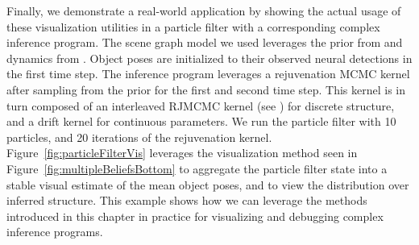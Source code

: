 Finally, we demonstrate a real-world application by showing the actual usage of these visualization utilities in a particle filter with a corresponding complex inference program.
The scene graph model we used leverages the prior from  and dynamics from .
Object poses are initialized to their observed neural detections in the first time step.
The inference program leverages a rejuvenation MCMC kernel after sampling from the prior for the first and second time step.
This kernel is in turn composed of an interleaved RJMCMC kernel (see ) for discrete structure, and a drift kernel for continuous parameters.
We run the particle filter with 10 particles, and 20 iterations of the rejuvenation kernel.
Figure~\ref{fig:particleFilterVis} leverages the visualization method seen in Figure~\ref{fig:multipleBeliefsBottom} to aggregate the particle filter state into a stable visual estimate of the mean object poses, and to view the distribution over inferred structure.
This example shows how we can leverage the methods introduced in this chapter in practice for visualizing and debugging complex inference programs.
